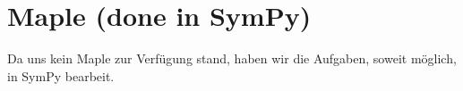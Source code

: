 \chapter{Maple (done in SymPy)}

\addtocounter{section}{44}

Da uns kein Maple zur Verfügung stand, haben wir die Aufgaben, soweit möglich, in SymPy bearbeit.









